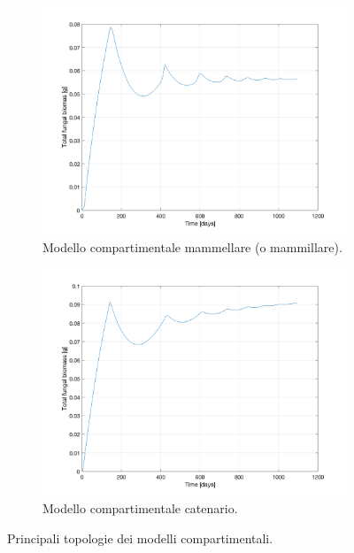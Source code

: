 \documentclass[12pt]{article}
\begin{document}
\begin{figure}[H]
	\begin{subfigure}[t]{0.5\textwidth}
		\includegraphics[width=\textwidth]{biomass_growth_no_Cterm.png}
		\caption{Modello compartimentale mammellare (o mammillare).}
		\label{fig-a}
	\end{subfigure}\hfill
	\begin{subfigure}[t]{0.5\textwidth}
		\includegraphics[width=\textwidth]{biomass_growth_Cterm.png}
		\caption{Modello compartimentale catenario.}
		\label{fig-b}
	\end{subfigure}
	\caption{Principali topologie dei modelli compartimentali.} 
	\label{fig:main}
\end{figure}
\end{document}
